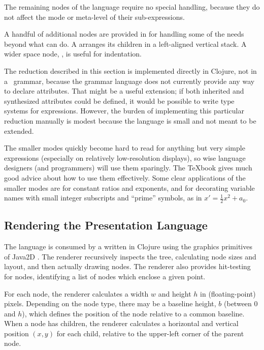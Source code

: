 \vspace{12pt}
The remaining nodes of the  language require no special handling, because they do not affect the mode or meta-level of their sub-expressions.

A handful of additional nodes are provided in  for handling some of the needs beyond what  can do. A  arranges its children in a left-aligned vertical stack. A wider space node, , is useful for indentation.

The reduction described in this section is implemented directly in Clojure, not in a \Meta\ grammar, because the grammar language does not currently provide any way to declare attributes. That might be a useful extension; if both inherited and synthesized attributes \cite{attribute-grammar} could be defined, it would be possible to write type systems for expressions. However, the burden of implementing this particular reduction manually is modest because the  language is small and not meant to be extended.

The smaller modes quickly become hard to read for anything but very simple expressions (especially on relatively low-resolution displays), so wise language designers (and programmers) will use them sparingly. The \TeX book \cite{knuth} gives much good advice about how to use them effectively. Some clear applications of the smaller modes are for constant ratios and exponents, and for decorating variable names with small integer subscripts and ``prime'' symbols, as in $x' = \frac{1}{2}x^2 + a_0$.


\subsection{Rendering the \textit{} Presentation Language}
The  language is consumed by a  written in Clojure using the graphics primitives of Java2D \cite{java2d}. The renderer recursively inspects the tree, calculating node sizes and layout, and then actually drawing nodes. The renderer also provides hit-testing for nodes, identifying a list of  nodes which enclose a given point.

For each node, the renderer calculates a width $w$ and height $h$ in (floating-point) pixels. Depending on the node type, there may be a baseline height, $b$ (between 0 and $h$), which defines the position of the node relative to a common baseline. When a node has children, the renderer calculates a horizontal and vertical position $(x, y)$ for each child, relative to the upper-left corner of the parent node.

